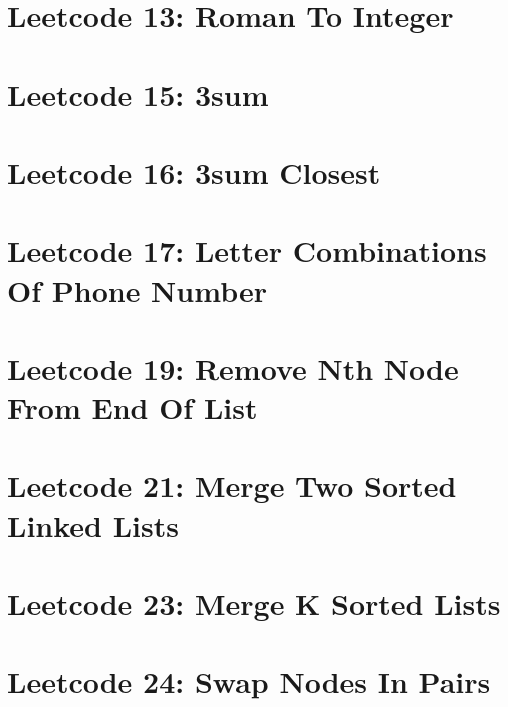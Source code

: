 \documentclass{article}
\begin{document}
\section*{Leetcode 13: Roman To Integer}

\pagebreak 

\section*{Leetcode 15: 3sum}

\pagebreak 

\section*{Leetcode 16: 3sum Closest}

\pagebreak 

\section*{Leetcode 17: Letter Combinations Of Phone Number}

\pagebreak 

\section*{Leetcode 19: Remove Nth Node From End Of List}

\pagebreak 

\section*{Leetcode 21: Merge Two Sorted Linked Lists}

\pagebreak 

\section*{Leetcode 23: Merge K Sorted Lists}

\pagebreak 

\section*{Leetcode 24: Swap Nodes In Pairs}

\pagebreak 
\end{document}
